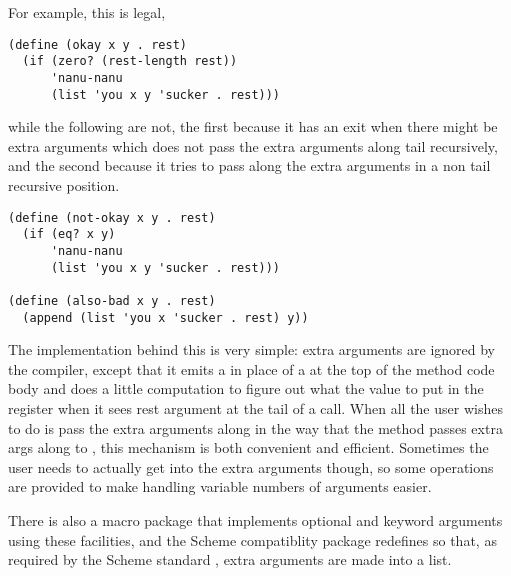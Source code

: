 For example, this is legal,
\begin{verbatim}
(define (okay x y . rest)
  (if (zero? (rest-length rest))
      'nanu-nanu
      (list 'you x y 'sucker . rest)))
\end{verbatim}
while the following are not, the first because it has an exit when
there might be extra arguments which does not pass the extra arguments
along tail recursively, and the second because it tries to pass along
the extra arguments in a non tail recursive position.
\begin{verbatim}
(define (not-okay x y . rest)
  (if (eq? x y)
      'nanu-nanu
      (list 'you x y 'sucker . rest)))

(define (also-bad x y . rest)
  (append (list 'you x 'sucker . rest) y))
\end{verbatim}

The implementation behind this is very simple: extra arguments are
ignored by the compiler, except that it emits a 
in place of a  at the top of the method code body and
does a little computation to figure out what the value to put in the
 register when it sees rest argument at the tail of a call.
When all the user wishes to do is pass the extra arguments along in
the way that the  method passes extra args along to
, this mechanism is both convenient and efficient.
Sometimes the user needs to actually get into the extra arguments
though, so some operations are provided to make handling variable
numbers of arguments easier.



There is also a macro package that implements optional and keyword
arguments using these facilities, and the Scheme compatiblity package
redefines  so that, as required by the Scheme standard
\cite{R3RS}, extra arguments are made into a list.
